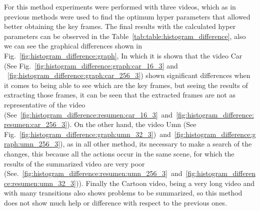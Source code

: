 \documentclass[journal]{IEEEtran}
\begin{document}
For this method experiments were performed with three videos, which as in previous methods were used to find the optimum hyper parameters that allowed better obtaining the key frames. The final results with the calculated hyper parameters can be observed in the Table~\ref{tab:table:histogram_difference}, also we can see the graphical differences shown in Fig.~\ref{fig:histogram_difference:graph},  In which it is shown that the video Car (See Fig.~\ref{fig:histogram_difference:graph:car_16_3} and ~\ref{fig:histogram_difference:graph:car_256_3}) shown significant differences when it comes to being able to see which are the key frames, but seeing the results of extracting those frames, it can be seen that the extracted frames are not as representative of the video (See~\ref{fig:histogram_difference:resumen:car_16_3}~and~\ref{fig:histogram_difference:resumen:car_256_3}). On the other hand, the video Umn (See Fig.~\ref{fig:histogram_difference:graph:umn_32_3})~and~\ref{fig:histogram_difference:graph:umn_256_3}), as in all other method, its necessary to make a search of the changes, this because all the actions occur in the same scene, for which the results of the summarized video are very poor (See.~\ref{fig:histogram_difference:resumen:umn_256_3}~and~\ref{fig:histogram_difference:resumen:umn_32_3})). Finally the Cartoon video, being a very long video and with many transitions also shows problems to be summarized, so this method does not show much help or difference with respect to the previous ones.
\end{document}
